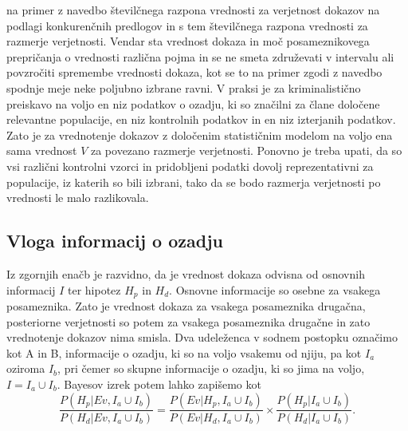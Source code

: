 \documentclass[12pt,a4paper]{amsart}
\theoremstyle{definition} %
\theoremstyle{plain} %
\begin{document}
na primer z navedbo številčnega razpona vrednosti za verjetnost dokazov na podlagi konkurenčnih predlogov in s tem številčnega razpona vrednosti za razmerje verjetnosti. Vendar sta vrednost dokaza in moč posameznikovega prepričanja o vrednosti različna pojma 
in se ne smeta združevati v intervalu ali povzročiti spremembe vrednosti dokaza, kot se to na primer zgodi z navedbo spodnje meje neke poljubno izbrane ravni. V praksi je za kriminalistično preiskavo na voljo en niz podatkov o ozadju, 
ki so značilni za člane določene relevantne populacije, en niz kontrolnih podatkov in en niz izterjanih podatkov. Zato je za vrednotenje dokazov z določenim statističnim modelom na voljo ena sama vrednost $V$ za povezano razmerje verjetnosti. Ponovno je 
treba upati, da so vsi različni kontrolni vzorci in pridobljeni podatki dovolj reprezentativni za populacije, iz katerih so bili izbrani, tako da se bodo razmerja verjetnosti po vrednosti le malo razlikovala. 

\subsection{Vloga informacij o ozadju}
Iz zgornjih enačb je razvidno, da je vrednost dokaza odvisna od osnovnih informacij $I$ ter hipotez $H_p$ in $H_d$. Osnovne informacije so osebne za vsakega posameznika. Zato je vrednost dokaza za vsakega posameznika drugačna, posteriorne verjetnosti so 
potem za vsakega posameznika drugačne in zato vrednotenje dokazov nima smisla. Dva udeleženca v sodnem postopku označimo kot A in B, informacije o ozadju, ki so na voljo vsakemu od njiju, pa kot $I_a$ oziroma $I_b$, pri čemer so skupne informacije o ozadju, 
ki so jima na voljo, $I = I_a \cup I_b$.  Bayesov izrek potem lahko zapišemo kot
\[
    \frac{P(H_p \lvert Ev, I_a \cup I_b)}{P(H_d \lvert Ev, I_a \cup I_b)} = \frac{P(Ev \lvert H_p, I_a \cup I_b)}{P(Ev \lvert H_d, I_a \cup I_b)} \times \frac{P(H_p \lvert I_a \cup I_b)}{P(H_d \lvert I_a \cup I_b)}. 
\]

\end{document}
